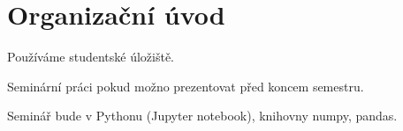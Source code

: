 \documentclass[12pt]{article}					%
\begin{document}

\section*{Organizační úvod}
\begin{poznamka}
	Používáme studentské úložiště.

	Seminární práci pokud možno prezentovat před koncem semestru.

	Seminář bude v Pythonu (Jupyter notebook), knihovny numpy, pandas.
\end{poznamka}
\end{document}
